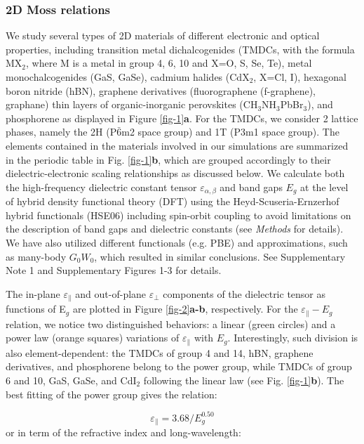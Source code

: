 \documentclass[journal=ancac3,manuscript=article,email=true,hyperref=true,keywords=true]{achemso}
\begin{document}
\subsubsection{2D Moss relations}
We study several types of 2D materials of different electronic and optical properties, 
including transition metal dichalcogenides (TMDCs, with the formula MX\(_{\text{2}}\),
where M is a metal in group 4, 6, 10 and X=O, S, Se, Te), metal
monochalcogenides (GaS, GaSe), cadmium halides (CdX$_2$, X=Cl, I), 
hexagonal boron nitride (hBN), graphene derivatives (fluorographene (f-graphene), graphane) 
thin layers of organic-inorganic perovskites (CH$_3$NH$_3$PbBr$_3$),  
and phosphorene as displayed in Figure \ref{fig-1}{\bf a}. For the TMDCs, we consider 
2 lattice phases, namely the 2H (P\(\bar{6}\)m2 space group) and 1T (P3m1 space group). 
The elements contained in the materials involved in our 
simulations are summarized in the periodic table in Fig. \ref{fig-1}{\bf b}, 
which are grouped accordingly to their dielectric-electronic scaling 
relationships as discussed below. 
We calculate both the high-frequency dielectric constant tensor  
$\varepsilon_{\alpha,\beta}$ 
and band gaps $E_{g}$ at the level of 
hybrid density functional theory (DFT) using the Heyd-Scuseria-Ernzerhof
hybrid functionals (HSE06) including spin-orbit 
coupling to avoid limitations on the description of band gaps 
and dielectric constants (see {\it Methods} for details). 
We have also utilized different 
functionals (e.g. PBE) and approximations, 
such as many-body $G_0W_0$, which resulted in similar conclusions. 
See Supplementary Note 1 and Supplementary Figures 1-3 for details. 


The in-plane $\varepsilon_{\parallel}$ and out-of-plane $\varepsilon_{\perp}$ 
components of the dielectric tensor as functions of E$_{g}$
are plotted in Figure \ref{fig-2}{\bf a-b}, respectively. 
For the $\varepsilon_{\parallel}-E_{g}$ relation, we notice two distinguished 
behaviors: a linear (green circles) and a power law (orange squares) 
variations of $\varepsilon_{\parallel}$ with $E_{g}$. Interestingly, such division 
is also element-dependent: the
TMDCs of group 4 and 14, hBN, graphene derivatives, and phosphorene
belong to the power group, while TMDCs of group 6 and 10, GaS, GaSe,
and CdI\(_{\text{2}}\) following the linear law (see Fig. \ref{fig-1}{\bf b}). 
The best fitting of the power group gives the relation: 

\begin{equation}
\label{Moss-2D-power}
\varepsilon_{\parallel}=3.68/E_{g}^{0.50}
\end{equation}
or in term of the refractive index and long-wavelength:
\end{document}
